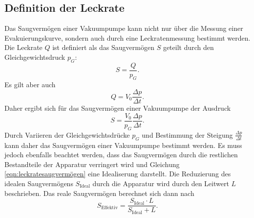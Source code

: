 \subsection{Definition der Leckrate}
\label{subsec:leckratetheorie}
Das Saugvermögen einer Vakuumpumpe kann nicht nur über die Messung einer Evakuierungskurve, sondern auch
durch eine Leckratenmessung bestimmt werden. Die Leckrate $Q$ ist definiert als das Saugvermögen $S$ geteilt durch
den Gleichgewichtsdruck $p_{G}$:
\begin{equation}
 S = \frac{Q}{p_{G}}.
\end{equation}
Es gilt aber auch
\begin{equation}
 Q = V_{0} \frac{\Delta p}{\Delta t}.
\end{equation}
Daher ergibt sich für das Saugvermögen einer Vakuumpumpe der Ausdruck
\begin{equation}
 S = \frac{V_{0}}{p_{G}} \frac{\Delta p}{\Delta t}.
 \label{eqn:leckratesaugvermögen}
\end{equation}
Durch Variieren der Gleichgewichtsdrücke $p_{G}$ und Bestimmung der Steigung $\frac{\Delta p}{\Delta t}$
kann daher das Saugvermögen einer Vakuumpumpe bestimmt werden. Es muss jedoch ebenfalls beachtet
werden, dass das Saugvermögen durch die restlichen Bestandteile der Apparatur verringert wird und
Gleichung \ref{eqn:leckratesaugvermögen} eine Idealiserung darstellt. Die Reduzierung des idealen
Saugvermögens $S_{\text{Ideal}}$ durch die Apparatur wird durch den Leitwert $L$ beschrieben. Das reale Saugvermögen
berechnet sich dann nach
\begin{equation}
 S_{\text{Effektiv}} = \frac{S_{\text{Ideal}} \cdot L}{S_{\text{Ideal}} + L}.
 \label{eqn:saugvermögenleitwert}
\end{equation}
